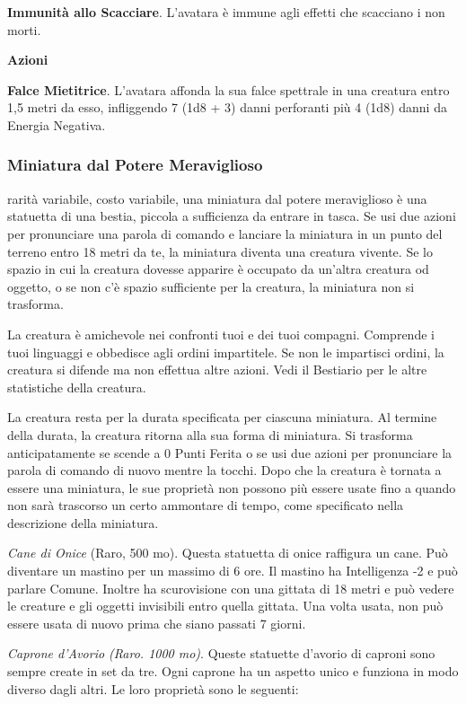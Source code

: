 \begin{multicols}{2}
	\textbf{Immunità allo Scacciare}. L'avatara è immune agli effetti che scacciano i non morti.

	\textbf{Azioni}

	\textbf{Falce Mietitrice}. L'avatara affonda la sua falce spettrale in una creatura entro 1,5 metri da esso, infliggendo 7 (1d8 + 3) danni perforanti più 4 (1d8) danni da Energia Negativa.

	\subsubsection*{Miniatura dal Potere Meraviglioso}
	rarità variabile, costo variabile, una miniatura dal potere meraviglioso è una statuetta di una bestia, piccola a sufficienza da entrare in tasca. Se usi due azioni per pronunciare una parola di comando e lanciare la miniatura in un punto del terreno entro 18 metri da te, la miniatura diventa una creatura vivente. Se lo spazio in cui la creatura dovesse apparire è occupato da un'altra creatura od oggetto, o se non c'è spazio sufficiente per la creatura, la miniatura non si trasforma.

	La creatura è amichevole nei confronti tuoi e dei tuoi compagni. Comprende i tuoi linguaggi e obbedisce agli ordini impartitele. Se non le impartisci ordini, la creatura si difende ma non effettua altre azioni. Vedi il Bestiario per le altre statistiche della creatura.

	La creatura resta per la durata specificata per ciascuna miniatura. Al termine della durata, la creatura ritorna alla sua forma di miniatura. Si trasforma anticipatamente se scende a 0 Punti Ferita o se usi due azioni per pronunciare la parola di comando di nuovo mentre la tocchi. Dopo che la creatura è tornata a essere una miniatura, le sue proprietà non possono più essere usate fino a quando non sarà trascorso un certo ammontare di tempo, come specificato nella descrizione della miniatura.

	\textit{Cane di Onice} (Raro, 500 mo). Questa statuetta di onice raffigura un cane. Può diventare un mastino per un massimo di 6 ore. Il mastino ha Intelligenza -2 e può parlare Comune. Inoltre ha scurovisione con una gittata di 18 metri e può vedere le creature e gli oggetti invisibili entro quella gittata. Una volta usata, non può essere usata di nuovo prima che siano passati 7 giorni.

	\textit{Caprone d'Avorio (Raro. 1000 mo)}. Queste statuette d'avorio di caproni sono sempre create in set da tre. Ogni caprone ha un aspetto unico e funziona in modo diverso dagli altri. Le loro proprietà sono le seguenti:


\end{multicols}
